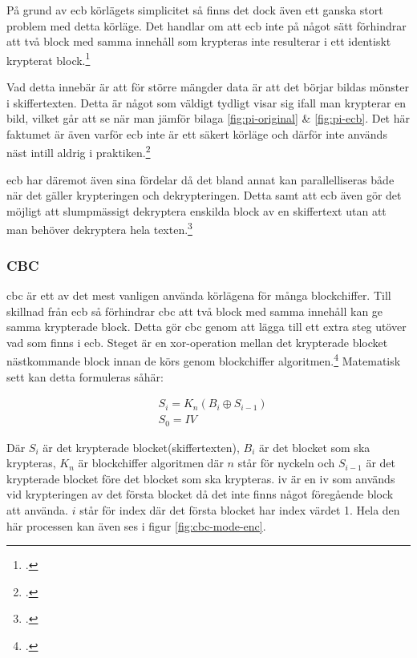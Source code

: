 På grund av \acrshort{ecb} körlägets simplicitet så finns det dock även ett ganska
stort problem med detta körläge. Det handlar om att \acrshort{ecb} inte på något
sätt förhindrar att två block med samma innehåll som krypteras inte resulterar i
ett identiskt krypterat block.\footcite{dworkin2001sp}

Vad detta innebär är att för större mängder data
är att det börjar bildas mönster i skiffertexten. Detta är något som väldigt
tydligt visar sig ifall man krypterar en bild, vilket går att se när man jämför
bilaga \ref{fig:pi-original} \& \ref{fig:pi-ecb}.
Det här faktumet är även varför \acrshort{ecb} inte är ett säkert körläge
och därför inte används näst intill aldrig i praktiken.\footcite{dworkin2001sp}

\acrshort{ecb} har däremot även sina fördelar då det bland annat kan parallelliseras
både när det gäller krypteringen och dekrypteringen. Detta samt att \acrshort{ecb}
även gör det möjligt att slumpmässigt dekryptera enskilda block av en skiffertext
utan att man behöver dekryptera hela texten.\footcite{dworkin2001sp}

\subsubsection{CBC}
\label{sec:cbc}
\acrlong{cbc} är ett av det mest vanligen använda körlägena för många blockchiffer.
Till skillnad från \acrshort{ecb} så förhindrar \acrshort{cbc} att två block med
samma innehåll kan ge samma krypterade block. Detta gör \acrshort{cbc} genom att
lägga till ett extra steg utöver vad som finns i \acrshort{ecb}. Steget
är en \gls{xor}-operation mellan det krypterade blocket nästkommande block innan
de körs genom blockchiffer algoritmen.\footcite{dworkin2001sp}
Matematisk sett kan detta formuleras såhär:

\begin{equation}
    \label{eq:cbc-encryption}
    \begin{aligned}
        &S_i = K_n(B_i \oplus S_{i-1})\\\nonumber
        &S_0 = IV
    \end{aligned}
\end{equation}

Där $S_i$ är det krypterade blocket(skiffertexten), $B_i$ är det blocket som ska krypteras,
$K_n$ är blockchiffer algoritmen där $n$ står för nyckeln och $S_{i-1}$ är
det krypterade blocket före det blocket som ska krypteras. \acrshort{iv} är en
\acrfull{iv} som används vid krypteringen av det första blocket då det inte finns
något föregående block att använda. $i$ står för index där det första blocket har
index värdet 1. Hela den här processen kan även ses i figur \ref{fig:cbc-mode-enc}.

